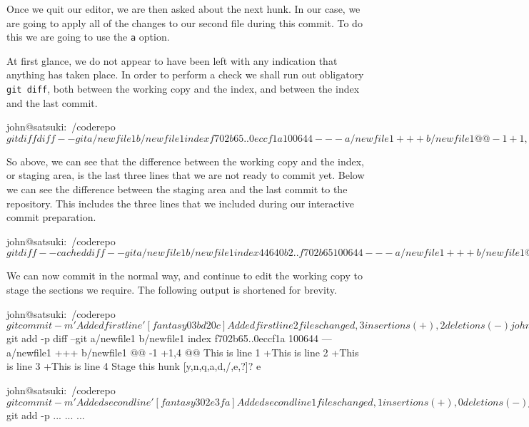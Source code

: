 Once we quit our editor, we are then asked about the next hunk.  In our case, we are going to apply all of the changes to our second file during this commit.  To do this we are going to use the \texttt{a} option.


At first glance, we do not appear to have been left with any indication that anything has taken place.  In order to perform a check we shall run out obligatory \texttt{git diff}, both between the working copy and the index, and between the index and the last commit.

\begin{code}
john@satsuki:~/coderepo$ git diff
diff --git a/newfile1 b/newfile1
index f702b65..0eccf1a 100644
--- a/newfile1
+++ b/newfile1
@@ -1 +1,4 @@
 This is line 1
+This is line 2
+This is line 3
+This is line 4
john@satsuki:~/coderepo$ 
\end{code}

So above, we can see that the difference between the working copy and the index, or staging area, is the last three lines that we are not ready to commit yet.  Below we can see the difference between the staging area and the last commit to the repository.  This includes the three lines that we included during our interactive commit preparation.

\begin{code}
john@satsuki:~/coderepo$ git diff --cached
diff --git a/newfile1 b/newfile1
index 44640b2..f702b65 100644
--- a/newfile1
+++ b/newfile1
@@ -1,2 +1 @@
-A new file
-and some more awesome changes
+This is line 1
diff --git a/newfile2 b/newfile2
index 3545c1d..40efcce 100644
--- a/newfile2
+++ b/newfile2
@@ -1,2 +1,4 @@
 Another new file
 and a new awesome feature
+This is a new line
+This is another new line
john@satsuki:~/coderepo$ 
\end{code}

We can now commit in the normal way, and continue to edit the working copy to stage the sections we require.  The following output is shortened for brevity.

\begin{code}
john@satsuki:~/coderepo$ git commit -m 'Added first line'
[fantasy 03bd20c] Added first line
 2 files changed, 3 insertions(+), 2 deletions(-)
john@satsuki:~/coderepo$ git add -p
diff --git a/newfile1 b/newfile1
index f702b65..0eccf1a 100644
--- a/newfile1
+++ b/newfile1
@@ -1 +1,4 @@
 This is line 1
+This is line 2
+This is line 3
+This is line 4
Stage this hunk [y,n,q,a,d,/,e,?]? e

john@satsuki:~/coderepo$ git commit -m 'Added second line'
[fantasy 302e3fa] Added second line
 1 files changed, 1 insertions(+), 0 deletions(-)
john@satsuki:~/coderepo$ git add -p
...
...
...
\end{code}

